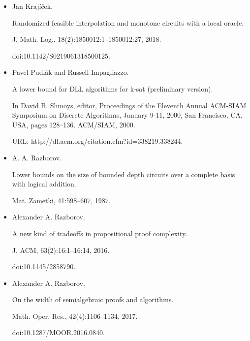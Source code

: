 \documentclass[10pt,a4paper]{article}
\begin{document}
\begin{itemize}
\item 
[26]

Jan Krajíček.


Randomized feasible interpolation and monotone circuits with a local
oracle.


J. Math. Log., 18(2):1850012:1–1850012:27, 2018.


doi:10.1142/S0219061318500125.





\item 
[27]

Pavel Pudlák and Russell Impagliazzo.


A lower bound for DLL algorithms for k-sat (preliminary
version).


In David B. Shmoys, editor, Proceedings of the Eleventh Annual
ACM-SIAM Symposium on Discrete Algorithms, January 9-11, 2000, San
Francisco, CA, USA, pages 128–136. ACM/SIAM, 2000.


URL: http://dl.acm.org/citation.cfm?id=338219.338244.





\item 
[28]

A. A. Razborov.


Lower bounds on the size of bounded depth circuits over a complete
basis with logical addition.


Mat. Zametki, 41:598–607, 1987.





\item 
[29]

Alexander A. Razborov.


A new kind of tradeoffs in propositional proof complexity.


J. ACM, 63(2):16:1–16:14, 2016.


doi:10.1145/2858790.





\item 
[30]

Alexander A. Razborov.


On the width of semialgebraic proofs and algorithms.


Math. Oper. Res., 42(4):1106–1134, 2017.


doi:10.1287/MOOR.2016.0840.






\end{itemize}
\end{document}
